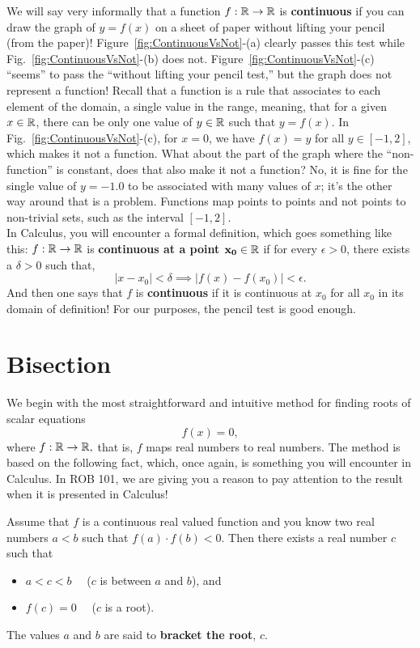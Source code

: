  We will say very informally that a function $f:\mathbb R \to \mathbb R$ is \textbf{continuous} if you can draw the graph of $y=f(x)$ on a sheet of paper without lifting your pencil (from the paper)! Figure~\ref{fig:ContinuousVsNot}-(a) clearly passes this test while Fig.~\ref{fig:ContinuousVsNot}-(b) does not. Figure~\ref{fig:ContinuousVsNot}-(c) ``seems'' to pass the ``without lifting your pencil test,'' but the graph does not represent a function! Recall that a function is a rule that associates to each element of the domain, a single value in the range, meaning, that for a given $x\in \mathbb R$, there can be only one value of $y\in \mathbb R$ such that $y=f(x)$. In Fig.~\ref{fig:ContinuousVsNot}-(c), for $x=0$, we have $f(x)=y$ for all $y\in [-1, 2]$, which makes it not a function. What about the part of the graph where the ``non-function'' is constant, does that also make it not a function? No, it is fine for the single value of $y=-1.0$ to be associated with many values of $x$; it's the other way around that is a problem. Functions map points to points and not points to non-trivial sets, such as the interval $[-1, 2]$. \\
 
 In Calculus, you will encounter a formal definition, which goes something like this:   $f:\mathbb R \to \mathbb R$ is \textbf{continuous at a point $\mathbf{ x_0 \in \mathbb R}$} if for every $\epsilon>0$, there exists a $\delta >0$ such that, $$ |x-x_0| < \delta \implies |f(x)-f(x_0)| < \epsilon.$$ 
 And then one says that $f$ is \textbf{continuous} if it is continuous at $x_0$ for all $x_0$ in its domain of definition! 
 For our purposes, the pencil test is good enough.






\section{Bisection}
\label{sec:BisectionAlgorithm}

We begin with the most straightforward and intuitive method for finding roots of scalar equations $$f(x)=0, $$
where $f:\mathbb R \to \mathbb R,$ that is, $f$ maps real numbers to real numbers. The method is based on the following fact, which, once again, is something you will encounter in Calculus. In ROB 101, we are giving you a reason to pay attention to the result when it is presented in Calculus! 

\vspace*{0.5cm}
\begin{tcolorbox}[sharp corners, colback=green!30, colframe=green!80!blue, title=\textbf{\large Intermediate Value Theorem}]
Assume that $f$ is a continuous real valued function and you know two real numbers $a < b$ such that $f(a) \cdot f(b) <0$. Then there exists a real number $c$ such that
\begin{itemize}
    \item $a < c < b$~~ ($c$ is between $a$ and $b$), and
    \item $f(c)=0$~~ ($c$ is a root).
\end{itemize}
The values $a$ and $b$ are said to \textbf{bracket the root}, $c$. 
\end{tcolorbox}

